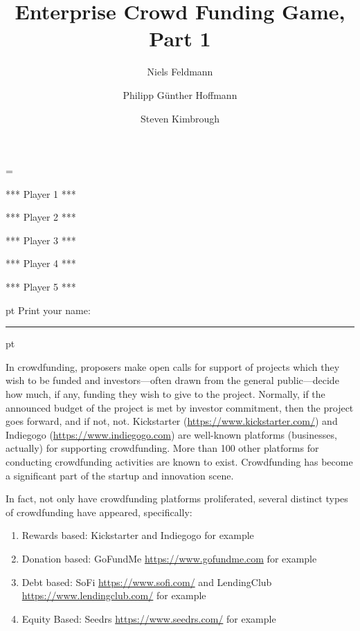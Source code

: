 \documentclass[11pt, oneside]{article}   	%
\title{Enterprise Crowd Funding Game, Part 1}
\author{Niels Feldmann \and Philipp G\"unther Hoffmann \and Steven Kimbrough}
\begin{document}
\maketitle
\newcount\playernum
{}
\setcounter{player}{1} %
\playernum = \theplayer

\ifnum{}
\centerline{*** Player 1 ***}
\fi
\ifnum{}
\centerline{*** Player 2 ***}
\fi
\ifnum{}
\centerline{*** Player 3 ***}
\fi
\ifnum{}
\centerline{*** Player 4 ***}
\fi
\ifnum{}
\centerline{*** Player 5 ***}
\fi
{} pt
\noindent Print your name: \rule{11cm}{2pt}
 pt

In crowdfunding, proposers make open calls for support of  projects which they wish to be funded and investors---often drawn from the general public---decide how much, if any, funding they wish to give to the project. Normally, if the announced budget of the project is met by investor commitment, then the project goes forward, and if not, not. Kickstarter (\url{https://www.kickstarter.com/}) and Indiegogo (\url{https://www.indiegogo.com}) are well-known platforms (businesses, actually) for supporting crowdfunding. More than 100 other platforms for conducting crowdfunding activities are known to exist. Crowdfunding has become a significant part of the startup and innovation scene.

In fact, not only have crowdfunding platforms proliferated, several distinct types of crowdfunding have appeared, specifically: 
\begin{enumerate}
\item Rewards based: Kickstarter and Indiegogo for example
\item Donation based: GoFundMe \url{https://www.gofundme.com} for example
\item Debt based: SoFi  \url{https://www.sofi.com/} and LendingClub \url{https://www.lendingclub.com/} for example
\item Equity Based: Seedrs \url{https://www.seedrs.com/} for example
\end{enumerate}
\end{document}
